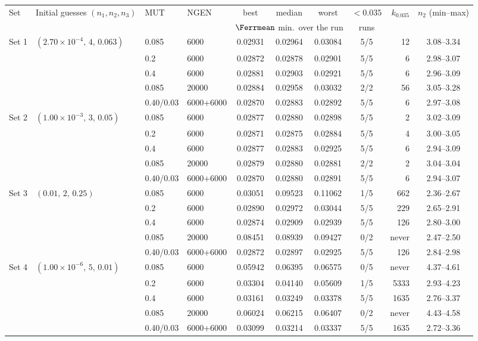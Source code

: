 \begin{tabular}{@{}l l l l c c c c r c@{}}
\toprule
Set & Initial guesses $(n_1,n_2,n_3)$ & MUT & NGEN & best & median & worst & $<0.035$ & $k_{0.035}$ & $n_2$ (min--max)\\
& & & & \multicolumn{3}{c}{$\Ferrmean$ min.\ over the run} & runs & & \\
\midrule
Set 1 & $(2.70\times10^{-4},\,4,\,0.063)$ & 0.085 & 6000 & 0.02931 & 0.02964 & 0.03084 & 5/5 & 12 & 3.08--3.34\\
 &  & 0.2 & 6000 & 0.02872 & 0.02878 & 0.02901 & 5/5 & 6 & 2.98--3.07\\
 &  & 0.4 & 6000 & 0.02881 & 0.02903 & 0.02921 & 5/5 & 6 & 2.96--3.09\\
 &  & 0.085 & 20000 & 0.02884 & 0.02958 & 0.03032 & 2/2 & 56 & 3.05--3.28\\
 &  & 0.40/0.03 & 6000+6000 & 0.02870 & 0.02883 & 0.02892 & 5/5 & 6 & 2.97--3.08\\
\midrule
Set 2 & $(1.00\times10^{-3},\,3,\,0.05)$ & 0.085 & 6000 & 0.02877 & 0.02880 & 0.02898 & 5/5 & 2 & 3.02--3.09\\
 &  & 0.2 & 6000 & 0.02871 & 0.02875 & 0.02884 & 5/5 & 4 & 3.00--3.05\\
 &  & 0.4 & 6000 & 0.02877 & 0.02883 & 0.02925 & 5/5 & 6 & 2.94--3.09\\
 &  & 0.085 & 20000 & 0.02879 & 0.02880 & 0.02881 & 2/2 & 2 & 3.04--3.04\\
 &  & 0.40/0.03 & 6000+6000 & 0.02870 & 0.02880 & 0.02891 & 5/5 & 6 & 2.94--3.07\\
\midrule
Set 3 & $(0.01,\,2,\,0.25)$ & 0.085 & 6000 & 0.03051 & 0.09523 & 0.11062 & \color{bad}1/5 & 662 & 2.36--2.67\\
 &  & 0.2 & 6000 & 0.02890 & 0.02972 & 0.03044 & 5/5 & 229 & 2.65--2.91\\
 &  & 0.4 & 6000 & 0.02874 & 0.02909 & 0.02939 & 5/5 & 126 & 2.80--3.00\\
 &  & 0.085 & 20000 & 0.08451 & 0.08939 & 0.09427 & \color{bad}0/2 & never & 2.47--2.50\\
 &  & 0.40/0.03 & 6000+6000 & 0.02872 & 0.02897 & 0.02925 & 5/5 & 126 & 2.84--2.98\\
\midrule
Set 4 & $(1.00\times10^{-6},\,5,\,0.01)$ & 0.085 & 6000 & 0.05942 & 0.06395 & 0.06575 & \color{bad}0/5 & never & 4.37--4.61\\
 &  & 0.2 & 6000 & 0.03304 & 0.04140 & 0.05609 & \color{bad}1/5 & 5333 & 2.93--4.23\\
 &  & 0.4 & 6000 & 0.03161 & 0.03249 & 0.03378 & 5/5 & 1635 & 2.76--3.37\\
 &  & 0.085 & 20000 & 0.06024 & 0.06215 & 0.06407 & \color{bad}0/2 & never & 4.43--4.58\\
 &  & 0.40/0.03 & 6000+6000 & 0.03099 & 0.03214 & 0.03337 & 5/5 & 1635 & 2.72--3.36\\
\bottomrule
\end{tabular}
